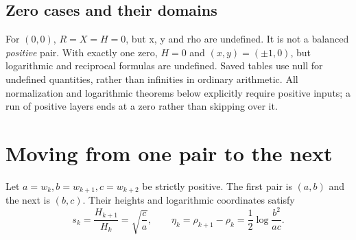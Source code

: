 \documentclass[11pt,a4paper]{article}
\begin{document}
\subsection{Zero cases and their domains}\label{sec:zeros}
For $(0,0)$, $R=X=H=0$, but x, y and rho are undefined. It is not a balanced \emph{positive} pair. With exactly one zero, $H=0$ and $(x,y)=(\pm1,0)$, but logarithmic and reciprocal formulas are undefined. Saved tables use null for undefined quantities, rather than infinities in ordinary arithmetic. All normalization and logarithmic theorems below explicitly require positive inputs; a run of positive layers ends at a zero rather than skipping over it.

\clearpage
\section{Moving from one pair to the next}
\label{sec:neighbor}
Let $a=w_k,b=w_{k+1},c=w_{k+2}$ be strictly positive. The first pair is $(a,b)$ and the next is $(b,c)$. Their heights and logarithmic coordinates satisfy
\begin{equation}
s_k=\frac{H_{k+1}}{H_k}=\sqrt{\frac ca},\qquad
\eta_k=\rho_{k+1}-\rho_k=\frac12\log\frac{b^2}{ac}.
\label{eq:s_eta}
\end{equation}
\end{document}
